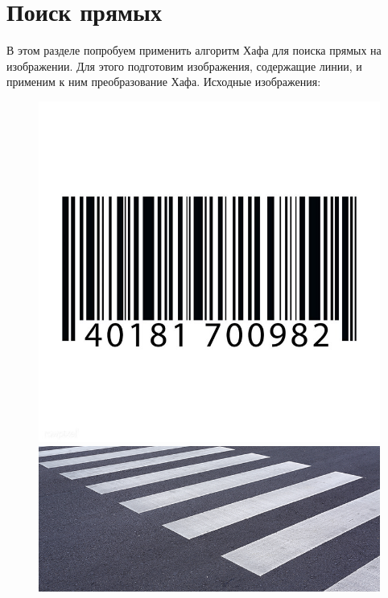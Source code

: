 \documentclass[a4paper,12pt]{article}
\begin{document}
\section{Поиск прямых}
В этом разделе попробуем применить алгоритм Хафа для поиска прямых на изображении. Для этого подготовим изображения, содержащие линии, и применим к ним преобразование Хафа. Исходные изображения:
\begin{figure}[H]
    \centering
    \begin{minipage}{0.48\textwidth}
        \centering
        \includegraphics[width=\textwidth]{images/barcode2.png}
    \end{minipage}
    \begin{minipage}{0.48\textwidth}
        \centering
        \includegraphics[width=\textwidth]{images/pedestrian.png}

\end{minipage}
\end{figure}
\end{document}

